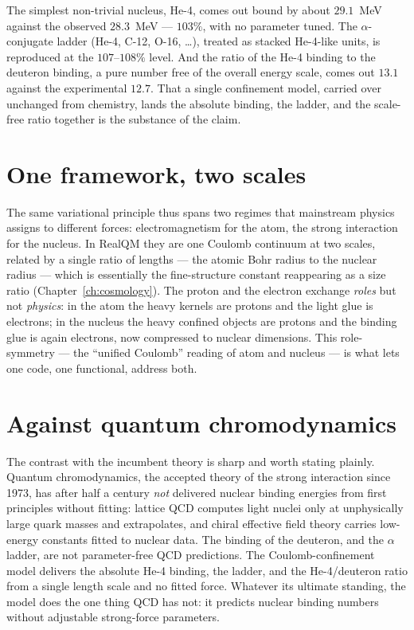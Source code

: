 The simplest non-trivial nucleus, He-4, comes out bound by about $29.1$~MeV against the observed $28.3$~MeV ---
$103\%$, with no parameter tuned. The $\alpha$-conjugate ladder (He-4, C-12, O-16, \dots), treated as stacked
He-4-like units, is reproduced at the $107$--$108\%$ level. And the ratio of the He-4 binding to the deuteron
binding, a pure number free of the overall energy scale, comes out $13.1$ against the experimental $12.7$. That a
single confinement model, carried over unchanged from chemistry, lands the absolute binding, the ladder, and the
scale-free ratio together is the substance of the claim.

\section{One framework, two scales}\label{sec:two-scales}

The same variational principle thus spans two regimes that mainstream physics assigns to different forces:
electromagnetism for the atom, the strong interaction for the nucleus. In RealQM they are one Coulomb continuum
at two scales, related by a single ratio of lengths --- the atomic Bohr radius to the nuclear radius --- which is
essentially the fine-structure constant reappearing as a size ratio (Chapter~\ref{ch:cosmology}). The
proton and the electron exchange \emph{roles} but not \emph{physics}: in the atom the heavy kernels are protons
and the light glue is electrons; in the nucleus the heavy confined objects are protons and the binding glue is
again electrons, now compressed to nuclear dimensions. This role-symmetry --- the ``unified Coulomb'' reading of
atom and nucleus --- is what lets one code, one functional, address both.

\section{Against quantum chromodynamics}\label{sec:vs-qcd}

The contrast with the incumbent theory is sharp and worth stating plainly. Quantum chromodynamics, the accepted
theory of the strong interaction since 1973, has after half a century \emph{not} delivered nuclear binding
energies from first principles without fitting: lattice QCD computes light nuclei only at unphysically large
quark masses and extrapolates, and chiral effective field theory carries low-energy constants fitted to nuclear
data. The binding of the deuteron, and the $\alpha$ ladder, are not parameter-free QCD predictions. The
Coulomb-confinement model delivers the absolute He-4 binding, the ladder, and the He-4/deuteron ratio from a
single length scale and no fitted force. Whatever its ultimate standing, the model does the one thing QCD has not:
it predicts nuclear binding numbers without adjustable strong-force parameters.

